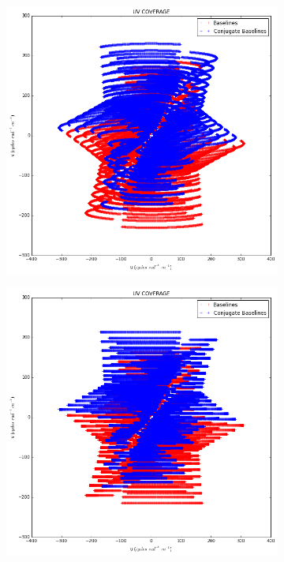 \begin{figure}[h]
\begin{mdframed}
\begin{subfigure}[b]{0.32\textwidth}
  \caption{}
 \end{subfigure}
 \begin{subfigure}[b]{0.32\textwidth}
  \includegraphics[width=\textwidth]{images/evla_observation/6hr_dec5.png}
  \caption{}
 \end{subfigure}
 \begin{subfigure}[b]{0.32\textwidth}
  \includegraphics[width=\textwidth]{images/evla_observation/6hr_dec0.png}

\end{subfigure}
\end{mdframed}
\end{figure}
